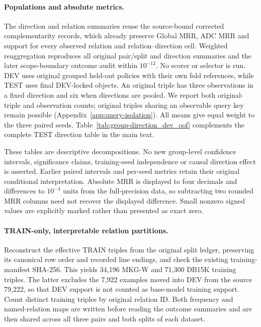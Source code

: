 \documentclass[11pt,a4paper]{article}
\begin{document}
\paragraph{Populations and absolute metrics.}
The direction and relation summaries reuse the source-bound corrected complementarity records, which already preserve Global MRR, ADC MRR and support for every observed relation and relation--direction cell. Weighted reaggregation reproduces all original pair/split and direction summaries and the later scope-boundary outcome audit within $10^{-12}$. No scorer or selector is run. DEV uses original grouped held-out policies with their own fold references, while TEST uses final DEV-locked objects. An original triple has three observations in a fixed direction and six when directions are pooled. We report both original-triple and observation counts; original triples sharing an observable query key remain possible (Appendix~\ref{app:query-isolation}). All means give equal weight to the three paired seeds. Table~\ref{tab:group-direction_dev_oof} complements the complete TEST direction table in the main text.


These tables are descriptive decompositions. No new group-level confidence intervals, significance claims, training-seed independence or causal direction effect is asserted. Earlier paired intervals and per-seed metrics retain their original conditional interpretation. Absolute MRR is displayed to four decimals and differences to $10^{-4}$ units from the full-precision data, so subtracting two rounded MRR columns need not recover the displayed difference. Small nonzero signed values are explicitly marked rather than presented as exact zero.

\paragraph{TRAIN-only, interpretable relation partitions.}
Reconstruct the effective TRAIN triples from the original split ledger, preserving its canonical row order and recorded line endings, and check the existing training-manifest SHA-256. This yields 34,196 MKG-W and 71,300 DB15K training triples. The latter excludes the 7,922 examples moved into DEV from the source 79,222, so that DEV support is not counted as base-model training support. Count distinct training triples by original relation ID. Both frequency and named-relation maps are written before reading the outcome summaries and are then shared across all three pairs and both splits of each dataset.
\end{document}

